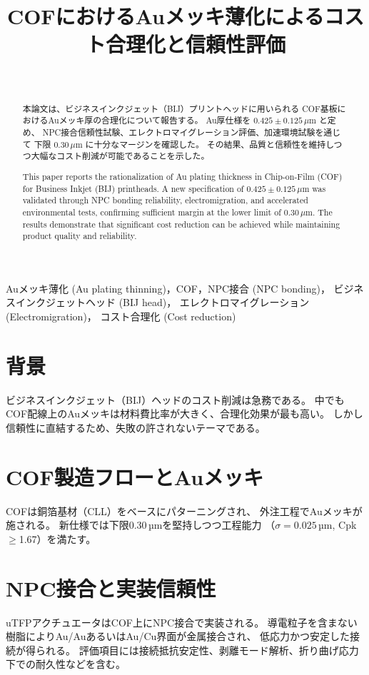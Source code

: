 \documentclass[conference]{IEEEtran}
\title{COFにおけるAuメッキ薄化によるコスト合理化と信頼性評価}
\author{%
  \IEEEauthorblockN{三溝 真一（Shinichi Samizo)}\\
  \IEEEauthorblockA{独立系半導体研究者（元セイコーエプソン）\\
  Email: \href{mailto:shin3t72@gmail.com}{shin3t72@gmail.com}\\
  GitHub: \url{https://github.com/Samizo-AITL}}%
}
\begin{document}
\maketitle

\begin{abstract}
本論文は、ビジネスインクジェット（BIJ）プリントヘッドに用いられる
COF基板におけるAuメッキ厚の合理化について報告する。
Au厚仕様を $0.425 \pm 0.125\,\mu$m と定め、
NPC接合信頼性試験、エレクトロマイグレーション評価、加速環境試験を通じて
下限 $0.30\,\mu$m に十分なマージンを確認した。
その結果、品質と信頼性を維持しつつ大幅なコスト削減が可能であることを示した。

\medskip
This paper reports the rationalization of Au plating thickness
in Chip-on-Film (COF) for Business Inkjet (BIJ) printheads.
A new specification of $0.425 \pm 0.125\,\mu$m was validated
through NPC bonding reliability, electromigration, and accelerated
environmental tests, confirming sufficient margin at the lower limit
of $0.30\,\mu$m. The results demonstrate that significant cost reduction
can be achieved while maintaining product quality and reliability.
\end{abstract}

\begin{IEEEkeywords}
Auメッキ薄化 (Au plating thinning)，COF，NPC接合 (NPC bonding)，
ビジネスインクジェットヘッド (BIJ head)，
エレクトロマイグレーション (Electromigration)，
コスト合理化 (Cost reduction)
\end{IEEEkeywords}

\section{背景}
ビジネスインクジェット（BIJ）ヘッドのコスト削減は急務である。
中でもCOF配線上のAuメッキは材料費比率が大きく、合理化効果が最も高い。
しかし信頼性に直結するため、失敗の許されないテーマである。

\section{COF製造フローとAuメッキ}
COFは銅箔基材（CLL）をベースにパターニングされ、
外注工程でAuメッキが施される。
新仕様では下限0.30\,µmを堅持しつつ工程能力
（$\sigma=0.025$\,µm, Cpk$\geq$1.67）を満たす。

\section{NPC接合と実装信頼性}
uTFPアクチュエータはCOF上にNPC接合で実装される。
導電粒子を含まない樹脂によりAu/AuあるいはAu/Cu界面が金属接合され、
低応力かつ安定した接続が得られる。
評価項目には接続抵抗安定性、剥離モード解析、折り曲げ応力下での耐久性などを含む。
\end{document}
